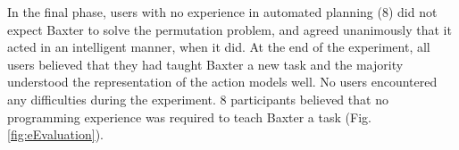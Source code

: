 In the final phase, users with no experience in automated planning (8) did not expect Baxter to solve the permutation problem, and agreed unanimously that it acted in an intelligent manner, when it did. At the end of the experiment, all users believed that they had taught Baxter a new task and the majority understood the representation of the action models well. No users encountered any difficulties during the experiment. 8 participants believed that no programming experience was required to teach Baxter a task (Fig. \ref{fig:eEvaluation}).


